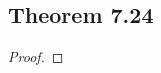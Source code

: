 \documentclass[../../main.tex]{subfiles}
\begin{document}
\subsection{Theorem 7.24}
\begin{wts}

\end{wts}
\begin{proof}

\end{proof}
\end{document}
